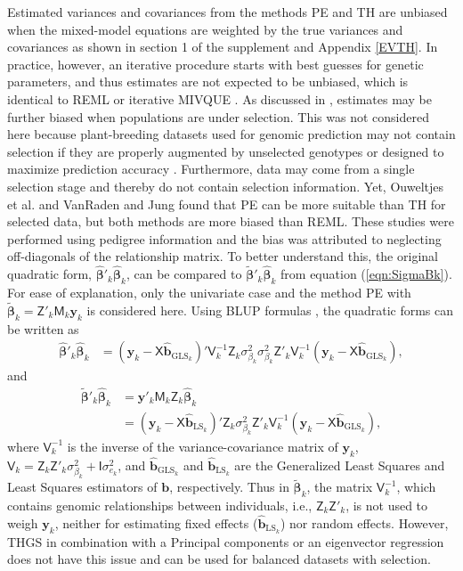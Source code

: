 \documentclass{bmcart}
\newcommand{\vecx}{\boldsymbol}
\newcommand{\mat}[1]{\boldsymbol{\mathsf{#1}}}
\begin{document}
Estimated variances and covariances from the methods PE and TH are unbiased when the mixed-model equations are weighted by the true variances and covariances as shown in section 1 of the supplement and Appendix \ref{EVTH}. In practice, however, an iterative procedure starts with best guesses for genetic parameters, and thus estimates are not expected to be unbiased, which is identical to REML or iterative MIVQUE \cite{Searle1992}. As discussed in \cite{VanRaden}, estimates may be further biased when populations are under selection. This was not considered here because plant-breeding datasets used for genomic prediction may not contain selection if they are properly augmented by unselected genotypes or designed to maximize prediction accuracy \cite{HabierOpt2013,Rincent2017}. Furthermore, data may come from a single selection stage and thereby do not contain selection information. Yet, Ouweltjes et al. \cite{Ouweltjes1988} and VanRaden and Jung \cite{VanRaden} found that PE can be more suitable than TH for selected data, but both methods are more biased than REML. These studies were performed using pedigree information and the bias was attributed to neglecting off-diagonals of the relationship matrix. To better understand this, the original quadratic form, $\hat{\vecx{\beta}}'_k\hat{\vecx{\beta}}_k$, can be compared to $\tilde{\vecx{\beta}}'_k\hat{\vecx{\beta}}_k$ from equation (\ref{eqn:SigmaBk}). For ease of explanation, only the univariate case and the method PE with $\tilde{\vecx{\beta}}_k = \mat{Z}'_k\mat{M}_{k} \vecx{y}_k$ is considered here. Using BLUP formulas \cite{Searle1992BLUP}, the quadratic forms can be written as
\begin{align}\label{QFORMS1}
    \hat{\vecx{\beta}}'_k\hat{\vecx{\beta}}_k &= (\vecx{y}_k-\mat{X}\hat{\vecx{b}}_{\textrm{GLS}_k})'\mat{V}^{-1}_k\mat{Z}_k\sigma^2_{\beta_k}\sigma^2_{\beta_k}\mat{Z}'_k\mat{V}^{-1}_k(\vecx{y}_k-\mat{X}\hat{\vecx{b}}_{\textrm{GLS}_k}),
\end{align}
and
\begin{align}\nonumber
    \tilde{\vecx{\beta}}'_k\hat{\vecx{\beta}}_k &= \vecx{y}'_k\mat{M}_k\mat{Z}_k
    \hat{\vecx{\beta}}_k\\\label{QFORMS2}
    &= (\vecx{y}_k-\mat{X}\hat{\vecx{b}}_{\textrm{LS}_k})'\mat{Z}_k\sigma^2_{\beta_k}\mat{Z}'_k\mat{V}^{-1}_k(\vecx{y}_k-\mat{X}\hat{\vecx{b}}_{\textrm{GLS}_k}),
\end{align}
where $\mat{V}^{-1}_k$ is the inverse of the variance-covariance matrix of $\vecx{y}_k$, $\mat{V}_k = \mat{Z}_k\mat{Z}'_k\sigma^2_{\beta_k}+\mat{I}\sigma^2_{e_k}$, and $\hat{\vecx{b}}_{\textrm{GLS}_k}$ and $\hat{\vecx{b}}_{\textrm{LS}_k}$ are the Generalized Least Squares and Least Squares estimators of $\vecx{b}$, respectively. Thus in $\tilde{\vecx{\beta}}_k$, the matrix $\mat{V}^{-1}_k$, which contains genomic relationships between individuals, i.e., $\mat{Z}_k\mat{Z}'_k$, is not used to weigh $\vecx{y}_k$, neither for estimating fixed effects ($\hat{\vecx{b}}_{\textrm{LS}_k}$) nor random effects. However, THGS in combination with a Principal components or an eigenvector regression does not have this issue and can be used for balanced datasets with selection.
\end{document}
